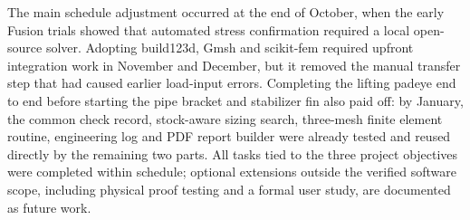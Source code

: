 The main schedule adjustment occurred at the end of October, when the early
Fusion trials showed that automated stress confirmation required a local
open-source solver. Adopting build123d, Gmsh and scikit-fem required upfront
integration work in November and December, but it removed the manual transfer
step that had caused earlier load-input errors. Completing the lifting padeye
end to end before starting the pipe bracket and stabilizer fin also paid off:
by January, the common check record, stock-aware sizing search, three-mesh
finite element routine, engineering log and PDF report builder were already
tested and reused directly by the remaining two parts. All tasks tied to the
three project objectives were completed within schedule; optional extensions
outside the verified software scope, including physical proof testing and a
formal user study, are documented as future work.

